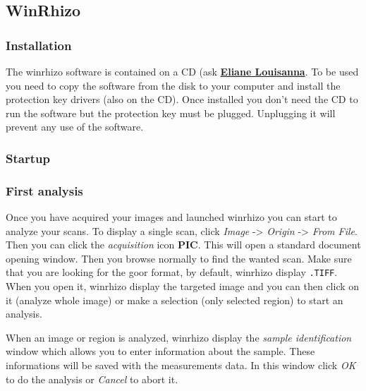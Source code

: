 \documentclass[
  12pt,
  american,
  a4paper,
  extrafontsizes,onecolumn,openright
  ]{memoir}
\begin{document}
\normalsize

\hypertarget{winrhizo}{%
\subsection{WinRhizo}\label{winrhizo}}

\hypertarget{installation}{%
\subsubsection{Installation}\label{installation}}

The winrhizo software is contained on a CD (ask \href{https://docs.google.com/spreadsheets/d/1EqjCVr6w7fykUJtLOVwSNBucNfFGbiYXGlRcoL-s7V8/edit\#gid=0}{\textbf{Eliane Louisanna}}. To be used you need to copy the software from the disk to your computer and install the protection key drivers (also on the CD). Once installed you don't need the CD to run the software but the protection key must be plugged. Unplugging it will prevent any use of the software.

\hypertarget{startup}{%
\subsubsection{Startup}\label{startup}}

\hypertarget{first-analysis}{%
\subsubsection{First analysis}\label{first-analysis}}

Once you have acquired your images and launched winrhizo you can start to analyze your scans. To display a single scan, click \emph{Image} -\textgreater{} \emph{Origin} -\textgreater{} \emph{From File}. Then you can click the \emph{acquisition }icon \textbf{PIC}.
This will open a standard document opening window. Then you browse normally to find the wanted scan. Make sure that you are looking for the goor format, by default, winrhizo display \texttt{.TIFF}.
When you open it, winrhizo display the targeted image and you can then click on it (analyze whole image) or make a selection (only selected region) to start an analysis.

When an image or region is analyzed, winrhizo display the \emph{sample identification} window which allows you to enter information about the sample. These informations will be saved with the measurements data. In this window click \emph{OK} to do the analysis or \emph{Cancel} to abort it.
\end{document}
